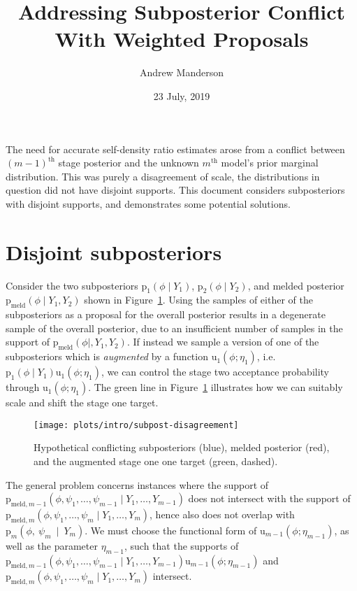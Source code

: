 \documentclass[10pt,a4paper,]{article}
\title{Addressing Subposterior Conflict With Weighted Proposals}
\author{Andrew Manderson}
\date{23 July, 2019}
\newcommand{\pd}{\text{p}}
\newcommand{\pmeld}{\pd_{\text{meld}}}
\newcommand{\tarw}{\text{u}}
\newcommand{\modelindex}{m}
\begin{document}
\maketitle

The need for accurate self-density ratio estimates arose from a conflict
between \((m - 1)^{\text{th}}\) stage posterior and the unknown
\(m^{\text{th}}\) model's prior marginal distribution. This was purely a
disagreement of scale, the distributions in question did not have
disjoint supports. This document considers subposteriors with disjoint
supports, and demonstrates some potential solutions.

\section{Disjoint subposteriors}\label{disjoint-subposteriors}

Consider the two subposteriors \(\pd_{1}(\phi \mid Y_{1})\),
\(\pd_{2}(\phi \mid Y_{2})\), and melded posterior
\(\pmeld(\phi \mid Y_{1}, Y_{2})\) shown in
Figure~\ref{fig:subpost_disagreement}. Using the samples of either of
the subposteriors as a proposal for the overall posterior results in a
degenerate sample of the overall posterior, due to an insufficient
number of samples in the support of \(\pmeld(\phi \mid, Y_{1}, Y_{2})\).
If instead we sample a version of one of the subposteriors which is
\emph{augmented} by a function \(\tarw_{1}(\phi; \eta_{1})\),
i.e.~\(\pd_{1}(\phi \mid Y_{1})\tarw_{1}(\phi; \eta_{1})\), we can
control the stage two acceptance probability through
\(\tarw_{1}(\phi; \eta_{1})\). The green line in
Figure~\ref{fig:subpost_disagreement} illustrates how we can suitably
scale and shift the stage one target.

\begin{figure}

{\centering \texttt{[image: plots/intro/subpost-disagreement]} 

}

\caption{Hypothetical conflicting subposteriors (blue), melded posterior (red), and the augmented stage one one target (green, dashed).}\label{fig:subpost_disagreement}
\end{figure}

The general problem concerns instances where the support of
\(\pd_{\text{meld}, \modelindex - 1}(\phi, \psi_{1}, \ldots, \psi_{\modelindex - 1} \mid Y_{1}, \ldots, Y_{\modelindex - 1})\)
does not intersect with the support of
\(\pd_{\text{meld}, \modelindex}(\phi, \psi_{1}, \ldots, \psi_{\modelindex} \mid Y_{1}, \ldots, Y_{\modelindex})\),
hence also does not overlap with
\(\pd_{\modelindex}(\phi,~\psi_{\modelindex}~\mid~Y_{\modelindex})\). We
must choose the functional form of
\(\tarw_{\modelindex - 1}(\phi; \eta_{\modelindex - 1})\), as well as
the parameter \(\eta_{\modelindex - 1}\), such that the supports of
\(\pd_{\text{meld}, \modelindex - 1}(\phi, \psi_{1}, \ldots, \psi_{\modelindex - 1} \mid Y_{1}, \ldots, Y_{\modelindex - 1})\tarw_{\modelindex - 1}(\phi; \eta_{\modelindex - 1})\)
and
\(\pd_{\text{meld}, \modelindex}(\phi, \psi_{1}, \ldots, \psi_{\modelindex} \mid Y_{1}, \ldots, Y_{\modelindex})\)
intersect.
\end{document}
